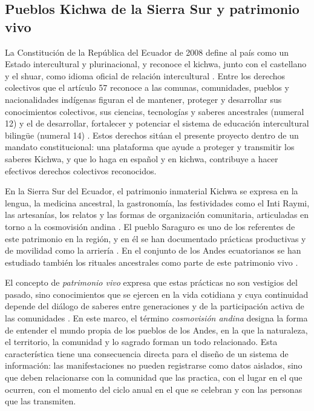 \subsection{Pueblos Kichwa de la Sierra Sur y patrimonio vivo}
La Constitución de la República del Ecuador de 2008 define al país como un Estado intercultural y plurinacional, y reconoce el kichwa, junto con el castellano y el shuar, como idioma oficial de relación intercultural \cite{ecuador2008constitucion}. Entre los derechos colectivos que el artículo 57 reconoce a las comunas, comunidades, pueblos y nacionalidades indígenas figuran el de mantener, proteger y desarrollar sus conocimientos colectivos, sus ciencias, tecnologías y saberes ancestrales (numeral 12) y el de desarrollar, fortalecer y potenciar el sistema de educación intercultural bilingüe (numeral 14) \cite{ecuador2008constitucion}. Estos derechos sitúan el presente proyecto dentro de un mandato constitucional: una plataforma que ayude a proteger y transmitir los saberes Kichwa, y que lo haga en español y en kichwa, contribuye a hacer efectivos derechos colectivos reconocidos.

En la Sierra Sur del Ecuador, el patrimonio inmaterial Kichwa se expresa en la lengua, la medicina ancestral, la gastronomía, las festividades como el Inti Raymi, las artesanías, los relatos y las formas de organización comunitaria, articuladas en torno a la cosmovisión andina \cite{quezada2026mobile}. El pueblo Saraguro es uno de los referentes de este patrimonio en la región, y en él se han documentado prácticas productivas y de movilidad como la arriería \cite{quezada2026muleteering}. En el conjunto de los Andes ecuatorianos se han estudiado también los rituales ancestrales como parte de este patrimonio vivo \cite{torres2022ancestral}.

El concepto de \textit{patrimonio vivo} expresa que estas prácticas no son vestigios del pasado, sino conocimientos que se ejercen en la vida cotidiana y cuya continuidad depende del diálogo de saberes entre generaciones y de la participación activa de las comunidades \cite{quezada2026muleteering}. En este marco, el término \textit{cosmovisión andina} designa la forma de entender el mundo propia de los pueblos de los Andes, en la que la naturaleza, el territorio, la comunidad y lo sagrado forman un todo relacionado. Esta característica tiene una consecuencia directa para el diseño de un sistema de información: las manifestaciones no pueden registrarse como datos aislados, sino que deben relacionarse con la comunidad que las practica, con el lugar en el que ocurren, con el momento del ciclo anual en el que se celebran y con las personas que las transmiten.

